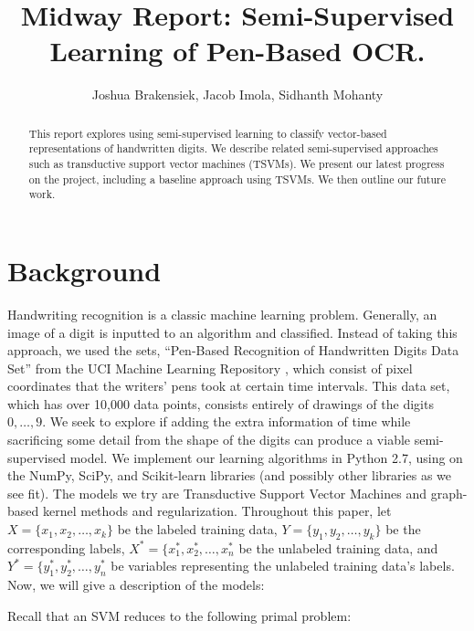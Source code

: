 \documentclass[11pt]{article}
\title{Midway Report: Semi-Supervised Learning of Pen-Based OCR.}
\author{Joshua Brakensiek, Jacob Imola, Sidhanth Mohanty}
\begin{document}
\maketitle

\begin{abstract}

  This report explores using semi-supervised learning to classify vector-based representations of handwritten digits. We describe related semi-supervised approaches such as transductive support vector machines (TSVMs). We present our latest progress on the project, including a baseline approach using TSVMs. We then outline our future work.

\end{abstract}



\newcommand{\Seq}{\operatorname{Seq}}

\section{Background}

Handwriting recognition is a classic machine learning problem. Generally, an image of a digit is inputted to an algorithm and classified. Instead of taking this approach, we used the sets,  ``Pen-Based Recognition of Handwritten Digits Data Set'' \cite{Alpaydin:1998} from the UCI Machine Learning Repository \cite{Lichman:2013}, which consist of pixel coordinates that the writers' pens took at certain time intervals. This data set, which has over 10,000 data points, consists entirely of drawings of the digits $0, \hdots, 9$. We seek to explore if adding the extra information of time while sacrificing some detail from the shape of the digits can produce a viable semi-supervised model.  We implement our learning algorithms in Python 2.7, using on the NumPy, SciPy, and Scikit-learn libraries (and possibly other libraries as we see fit). The models we try are Transductive Support Vector Machines and graph-based kernel methods and regularization. Throughout this paper, let $X = \{x_1, x_2, \ldots, x_k\}$ be the labeled training data, $Y = \{y_1, y_2, \ldots, y_k\}$ be the corresponding labels, $X^* = \{x^*_1, x^*_2, \ldots, x^*_n$ be the unlabeled training data, and $Y^* = \{y^*_1, y^*_2, \ldots, y^*_n$ be variables representing the unlabeled training data's labels. Now, we will give a description of the models: \par

Recall that an SVM reduces to the following primal problem:
\end{document}
